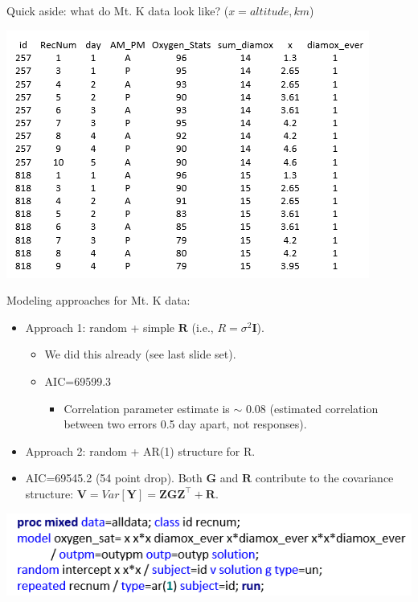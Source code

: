 \documentclass[
  9pt,
  ignorenonframetext,
]{beamer}
\providecommand{\tightlist}{%
  \setlength{\itemsep}{0pt}\setlength{\parskip}{0pt}}
\begin{document}
\begin{frame}{}
\protect\hypertarget{section-3}{}
Quick aside: what do Mt. K data look like? (\(x = altitude, km\))

\begin{center}\includegraphics[width=1\linewidth]{figs_L8/f1} \end{center}
\end{frame}

\begin{frame}{Modeling approaches for Mt. K data:}
\protect\hypertarget{modeling-approaches-for-mt.-k-data}{}
\begin{itemize}
\item
  Approach 1: random + simple \(\pmb R\) (i.e., \(R=\sigma^2 \pmb I\)).

  \begin{itemize}
  \tightlist
  \item
    We did this already (see last slide set).
  \item
    AIC=69599.3

    \begin{itemize}
    \tightlist
    \item
      Correlation parameter estimate is \(\sim\) 0.08 (estimated
      correlation between two errors 0.5 day apart, not responses).
    \end{itemize}
  \end{itemize}
\item
  Approach 2: random + AR(1) structure for R.
\item
  AIC=69545.2 (54 point drop). Both \(\pmb G\) and \(\pmb R\) contribute
  to the covariance structure:
  \(\pmb V=Var[\pmb Y]=\pmb {ZGZ}^{\top} + \pmb R\).
\end{itemize}

\begin{center}\includegraphics[width=0.7\linewidth]{figs_L8/f2} \end{center}
\end{frame}
\end{document}

